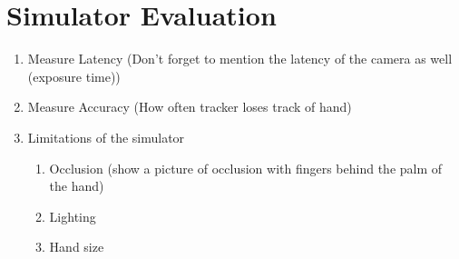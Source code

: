 \section{Simulator Evaluation}
\begin{enumerate}
	\item Measure Latency (Don't forget to mention the latency of the camera as well (exposure time))
	\item Measure Accuracy (How often tracker loses track of hand)
	\item Limitations of the simulator
	\begin {enumerate}
		\item Occlusion (show a picture of occlusion with fingers behind the palm of the hand)
		\item Lighting
		\item Hand size
	\end{enumerate}
\end{enumerate}